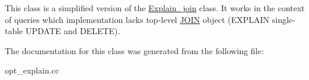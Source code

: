 This class is a simplified version of the \mbox{\hyperlink{classExplain__join}{Explain\+\_\+join}} class. It works in the context of queries which implementation lacks top-\/level \mbox{\hyperlink{classJOIN}{J\+O\+IN}} object (E\+X\+P\+L\+A\+IN single-\/table U\+P\+D\+A\+TE and D\+E\+L\+E\+TE). 

The documentation for this class was generated from the following file\+:\begin{DoxyCompactItemize}
\item 
opt\+\_\+explain.\+cc\end{DoxyCompactItemize}
